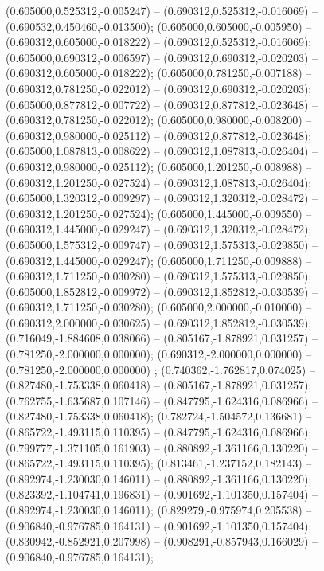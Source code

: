  (0.605000,0.525312,-0.005247) -- (0.690312,0.525312,-0.016069) -- (0.690532,0.450460,-0.013500);
 (0.605000,0.605000,-0.005950) -- (0.690312,0.605000,-0.018222) -- (0.690312,0.525312,-0.016069);
 (0.605000,0.690312,-0.006597) -- (0.690312,0.690312,-0.020203) -- (0.690312,0.605000,-0.018222);
 (0.605000,0.781250,-0.007188) -- (0.690312,0.781250,-0.022012) -- (0.690312,0.690312,-0.020203);
 (0.605000,0.877812,-0.007722) -- (0.690312,0.877812,-0.023648) -- (0.690312,0.781250,-0.022012);
 (0.605000,0.980000,-0.008200) -- (0.690312,0.980000,-0.025112) -- (0.690312,0.877812,-0.023648);
 (0.605000,1.087813,-0.008622) -- (0.690312,1.087813,-0.026404) -- (0.690312,0.980000,-0.025112);
 (0.605000,1.201250,-0.008988) -- (0.690312,1.201250,-0.027524) -- (0.690312,1.087813,-0.026404);
 (0.605000,1.320312,-0.009297) -- (0.690312,1.320312,-0.028472) -- (0.690312,1.201250,-0.027524);
 (0.605000,1.445000,-0.009550) -- (0.690312,1.445000,-0.029247) -- (0.690312,1.320312,-0.028472);
 (0.605000,1.575312,-0.009747) -- (0.690312,1.575313,-0.029850) -- (0.690312,1.445000,-0.029247);
 (0.605000,1.711250,-0.009888) -- (0.690312,1.711250,-0.030280) -- (0.690312,1.575313,-0.029850);
 (0.605000,1.852812,-0.009972) -- (0.690312,1.852812,-0.030539) -- (0.690312,1.711250,-0.030280);
 (0.605000,2.000000,-0.010000) -- (0.690312,2.000000,-0.030625) -- (0.690312,1.852812,-0.030539);
 (0.716049,-1.884608,0.038066) -- (0.805167,-1.878921,0.031257) -- (0.781250,-2.000000,0.000000);
 (0.690312,-2.000000,0.000000) -- (0.781250,-2.000000,0.000000) ;
 (0.740362,-1.762817,0.074025) -- (0.827480,-1.753338,0.060418) -- (0.805167,-1.878921,0.031257);
 (0.762755,-1.635687,0.107146) -- (0.847795,-1.624316,0.086966) -- (0.827480,-1.753338,0.060418);
 (0.782724,-1.504572,0.136681) -- (0.865722,-1.493115,0.110395) -- (0.847795,-1.624316,0.086966);
 (0.799777,-1.371105,0.161903) -- (0.880892,-1.361166,0.130220) -- (0.865722,-1.493115,0.110395);
 (0.813461,-1.237152,0.182143) -- (0.892974,-1.230030,0.146011) -- (0.880892,-1.361166,0.130220);
 (0.823392,-1.104741,0.196831) -- (0.901692,-1.101350,0.157404) -- (0.892974,-1.230030,0.146011);
 (0.829279,-0.975974,0.205538) -- (0.906840,-0.976785,0.164131) -- (0.901692,-1.101350,0.157404);
 (0.830942,-0.852921,0.207998) -- (0.908291,-0.857943,0.166029) -- (0.906840,-0.976785,0.164131);
